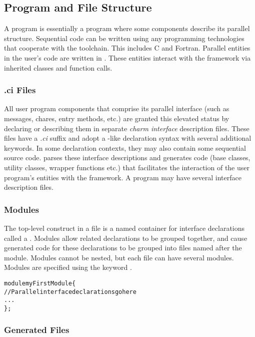 \subsection{Program and File Structure}

A \charm program is essentially a \CC program where some components describe
its parallel structure. Sequential code can be written using any programming
technologies that cooperate with the \CC toolchain. This includes C and
Fortran. Parallel entities in the user's code are written in \CC{}. These
entities interact with the \charm framework via inherited classes and function
calls.


\subsubsection{.ci Files}
All user program components that comprise its parallel interface (such as
messages, chares, entry methods, etc.) are granted this elevated status by
declaring or describing them in separate \emph{charm interface} description
files. These files have a \emph{.ci} suffix and adopt a \CC-like declaration
syntax with several additional keywords. In some declaration contexts, they
may also contain some sequential \CC source code.
\charm parses these interface descriptions and generates \CC code (base
classes, utility classes, wrapper functions etc.) that facilitates the
interaction of the user program's entities with the framework.  A program may
have several interface description files.


\subsubsection{Modules}
The top-level construct in a \ci file is a named container for interface
declarations called a . Modules allow related declarations to be
grouped together, and cause generated code for these declarations to be grouped
into files named after the module. Modules cannot be nested, but each \ci file
can have several modules. Modules are specified using the keyword .

\begin{alltt}
module myFirstModule \{
    // Parallel interface declarations go here
    ...
\};
\end{alltt}


\subsubsection{Generated Files}

